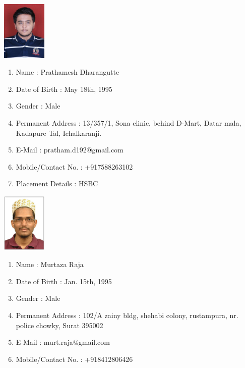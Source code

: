 \documentclass[oneside,a4paper,12pt]{book}
\begin{document}
\begin{appendices}
\begin{center}
	\includegraphics[width=60pt]{prathamesh.jpg}
\end{center}
\begin{enumerate}
	\item[] Name :  Prathamesh Dharangutte\hspace{90 mm}
	\item[] Date of Birth : May 18th, 1995
	\item[] Gender : Male
	\item[] Permanent Address : 13/357/1, Sona clinic, behind D-Mart, Datar mala, Kadapure Tal, Ichalkaranji. 
	\item[] E-Mail : pratham.d192@gmail.com	
	\item[] Mobile/Contact No. : +917588263102
	\item[] Placement Details : HSBC
\end{enumerate}

\newpage

\begin{center}
	\includegraphics[width=60pt]{murtaza.jpg}
\end{center}
\begin{enumerate}
	\item[] Name :  Murtaza Raja\hspace{90 mm}
	\item[] Date of Birth : Jan. 15th, 1995
	\item[] Gender : Male
	\item[] Permanent Address : 102/A zainy bldg, shehabi colony, rustampura, nr. police chowky, Surat 395002
	\item[] E-Mail : murt.raja@gmail.com	
	\item[] Mobile/Contact No. : +918412806426
\end{enumerate}

\end{appendices}
\end{document}

